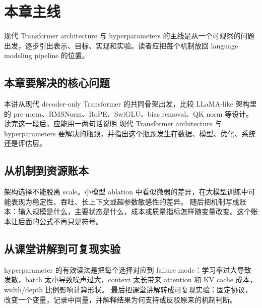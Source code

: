 \documentclass[a4paper]{article}
\begin{document}
\section{本章主线}
现代 Transformer architecture 与 hyperparameters 的主线是从一个可观察的问题出发，逐步引出表示、目标、实现和实验。读者应把每个机制放回 language modeling pipeline 的位置。
\subsection{本章要解决的核心问题}
本讲从现代 decoder-only Transformer 的共同骨架出发，比较 LLaMA-like 架构里的 pre-norm、RMSNorm、RoPE、SwiGLU、bias removal、QK norm 等设计。
读完这一段后，应能用一两句话说明 现代 Transformer architecture 与 hyperparameters 要解决的瓶颈，并指出这个瓶颈发生在数据、模型、优化、系统还是评估层。
\subsection{从机制到资源账本}
架构选择不能脱离 scale。小模型 ablation 中看似微弱的差异，在大模型训练中可能表现为稳定性、吞吐、长上下文或超参数敏感性的差异。
随后把机制写成账本：输入规模是什么，主要状态是什么，成本或质量指标怎样随变量改变。这个账本让后面的公式不再只是符号。
\subsection{从课堂讲解到可复现实验}
hyperparameter 的有效读法是把每个选择对应到 failure mode：学习率过大导致发散，batch 太小导致噪声过大，context 太长带来 attention 和 KV cache 成本，width/depth 比例影响计算形状。
最后把课堂讲解转成可复现实验：固定协议，改变一个变量，记录中间量，并解释结果为何支持或反驳原来的机制判断。
\end{document}
